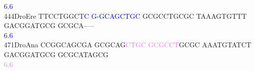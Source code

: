\documentclass[11pt,twoside,reqno,a4paper]{article}
\begin{document}
{\hspace*{4\charwidth}\hspace*{7\charwidth}\hspace*{9\charwidth}\textcolor{blue}{6.6}\hspace*{1\charwidth}\hspace*{1\charwidth}\hspace*{1\charwidth}\hspace*{1\charwidth}\hspace*{1\charwidth}\hspace*{1\charwidth}\\
444\hspace*{1\charwidth}DroEre	TTCCTGGCT\textcolor{blue}{C}	\textcolor{blue}{G}\textcolor{blue}{-}\textcolor{blue}{G}\textcolor{blue}{C}\textcolor{blue}{A}\textcolor{blue}{G}\textcolor{blue}{C}\textcolor{blue}{T}\textcolor{blue}{G}\textcolor{blue}{C}	GCGCCTGCGC	TAAAGTGTTT	GACGGATGCG	GCGCA-----	\\
\hspace*{4\charwidth}\hspace*{7\charwidth}\hspace*{9\charwidth}\textcolor{blue}{6.6}\hspace*{1\charwidth}\hspace*{1\charwidth}\hspace*{1\charwidth}\hspace*{1\charwidth}\hspace*{1\charwidth}\hspace*{1\charwidth}\\
471\hspace*{1\charwidth}DroAna	CCGGCAGCGA	GCGCAG\textcolor{violet}{C}\textcolor{violet}{T}\textcolor{violet}{G}\textcolor{violet}{C}	\textcolor{violet}{G}\textcolor{violet}{C}\textcolor{violet}{G}\textcolor{violet}{C}\textcolor{violet}{C}\textcolor{violet}{T}GCGC	AAATGTATCT	GACGGATGCG	GCGCATAGCG	\\
\hspace*{4\charwidth}\hspace*{7\charwidth}\hspace*{1\charwidth}\hspace*{16\charwidth}\textcolor{violet}{6.6}\hspace*{1\charwidth}\hspace*{1\charwidth}\hspace*{1\charwidth}\hspace*{1\charwidth}\hspace*{1\charwidth}\\
}
\end{document}
